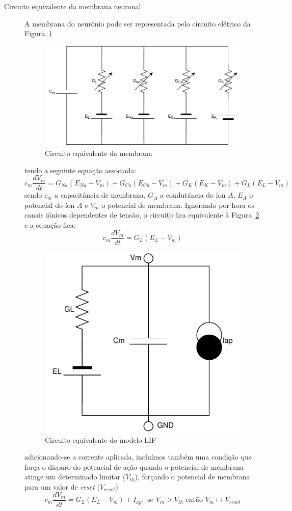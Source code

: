 \begin{description}
	\item[Circuito equivalente da membrana neuronal] A membrana do neurônio pode ser representada pelo circuito elétrico da Figura~\ref{fig:circuitomembrana}
	
	\begin{figure}[h!]
		\centering
		\caption{Circuito equivalente da membrana}
		\label{fig:circuitomembrana}
		\includegraphics[width=0.7\linewidth]{figs/circuito_membrana}
	\end{figure}
	
	tendo a seguinte equação associada:
	$$
	c_m\frac{dV_m}{dt} = G_{Na}(E_{Na}-V_m) + G_{Ca}(E_{Ca}-V_m) + G_K(E_K-V_m) + G_L(E_L-V_m)
	$$
	sendo $c_m$ a capacitância de membrana, $G_A$ a condutância do íon $A$, $E_A$ o potencial do íon $A$ e $V_m$ o potencial de membrana. Ignorando por hora os canais iônicos dependentes de tensão, o circuito fica equivalente à Figura~\ref{fig:circuitolif} e a equação fica:
	$$
	c_m\frac{dV_m}{dt} = G_L(E_L-V_m)
	$$
	
	\begin{figure}[h!]
		\centering
		\caption{Circuito equivalente do modelo LIF}
		\label{fig:circuitolif}
		\includegraphics[width=0.5\linewidth]{figs/circuito_lif}
	\end{figure}
	
	adicionando-se a corrente aplicada, incluímos também uma condição que força o disparo do potencial de ação quando o potencial de membrana atinge um determinado limitar ($V_{th}$), forçando o potencial de membrana para um valor de \textit{reset} ($V_{reset}$) \nocite{miller_introductory_2018}
	$$
	c_m\frac{dV_m}{dt} = G_L(E_L-V_m)+I_{ap}; \text{ se } V_m > V_{th} \text{ então } V_m\mapsto V_{reset}
	$$
	

\end{description}
